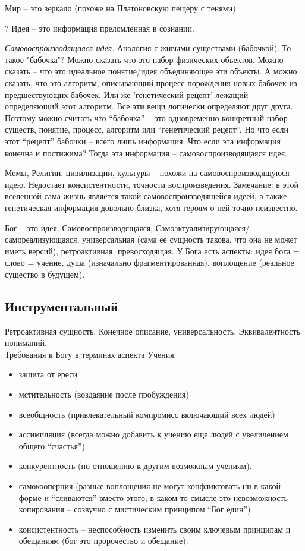 \documentclass[12pt,a4paper]{article}
\begin{document}
Мир -- это зеркало (похоже на Платоновскую пещеру с тенями)

? Идея -- это информация преломленная в сознании.

\textit{Самовоспроизводящаяся идея}. Аналогия с живыми существами (бабочкой). То такое "бабочка"? Можно сказать что это набор физических объектов. Можно сказать -- что это идеальное понятие/идея объединяющее эти объекты. А можно сказать, что это алгоритм, описывающий процесс порождения новых бабочек из предшествующих бабочек. Или же 'генетический рецепт' лежащий определяющий этот алгоритм. Все эти вещи логически определяют друг друга. Поэтому можно считать что ``бабочка'' -- это одновременно конкретный набор существ, понятие, процесс, алгоритм или ``генетический рецепт''. Но что если этот ``рецепт'' бабочки -- всего лишь информация. Что если эта информация конечна и постижима? Тогда эта информация -- самовоспроизводящаяся идея.

Мемы, Религии, цивилизации, культуры -- похожи на самовоспроизводящуюся идею. Недостает консистентности, точности воспроизведения. Замечание: в этой вселенной сама жизнь является такой самовоспроизводящейся идеей, а также генетическая информация довольно близка, хотя героям о ней точно неизвестно.

Бог -- это идея. Самовоспроизводящаяся, Самоактуализирующаяся/самореализующаяся, универсальная (сама ее сущность такова, что она не может иметь версий), ретроактивная, превосходящая.
У Бога есть аспекты: идея бога = слово = учение, душа (изначально фрагментированная), воплощение (реальное существо в будущем).

\subsection*{Инструментальный}
Ретроактивная сущность. Конечное описание, универсальность. Эквивалентность пониманий.\\

Требования к Богу в терминах аспекта Учения:
\begin{itemize}
	\item защита от ереси
	\item мстительность (воздаяние после пробуждения)
	\item всеобщность (привлекательный компромисс включающий всех людей)
	\item ассимиляция (всегда можно добавить к учению еще людей с увеличением общего ``счастья'')
	\item конкурентность (по отношению к другим возможным учениям).
	\item самокооперция (разные воплощения не могут конфликтовать ни в какой форме и ``сливаются'' вместо этого; в каком-то смысле это невозможность копирования -- созвучно с мистическим принципом ``Бог един'')
	\item консистентность -- неспособность изменить своим ключевым принципам и обещаниям (бог это пророчество и обещание).
\end{itemize}
\end{document}
